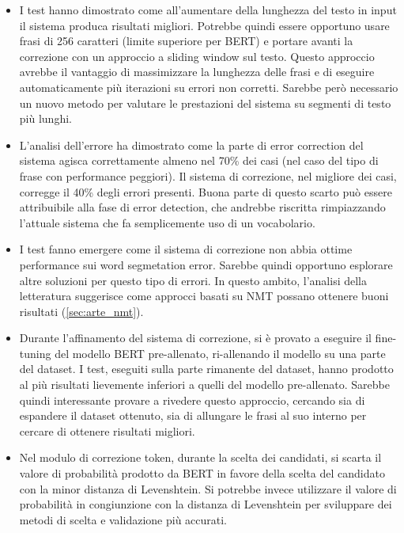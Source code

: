 \begin{itemize}
\item I test hanno dimostrato come all'aumentare della lunghezza del testo in input il sistema produca risultati migliori. Potrebbe quindi essere opportuno usare frasi di 256 caratteri (limite superiore per BERT) e portare avanti la correzione con un approccio a sliding window sul testo. Questo approccio avrebbe il vantaggio di massimizzare la lunghezza delle frasi e di eseguire automaticamente più iterazioni su errori non corretti. Sarebbe però necessario un nuovo metodo per valutare le prestazioni del sistema su segmenti di testo più lunghi.

\item L'analisi dell'errore ha dimostrato come la parte di error correction del sistema agisca correttamente almeno nel 70\% dei casi (nel caso del tipo di frase con performance peggiori). Il sistema di correzione, nel migliore dei casi, corregge il 40\% degli errori presenti. Buona parte di questo scarto può essere attribuibile alla fase di error detection, che andrebbe riscritta rimpiazzando l'attuale sistema che fa semplicemente uso di un vocabolario.

\item I test fanno emergere come il sistema di correzione non abbia ottime performance sui word segmetation error. Sarebbe quindi opportuno esplorare altre soluzioni per questo tipo di errori. In questo ambito, l'analisi della letteratura suggerisce come approcci basati su NMT possano ottenere buoni risultati (\autoref{sec:arte_nmt}).

\item Durante l'affinamento del sistema di correzione, si è provato a eseguire il fine-tuning del modello BERT pre-allenato, ri-allenando il modello su una parte del dataset. I test, eseguiti sulla parte rimanente del dataset, hanno prodotto al più risultati lievemente inferiori a quelli del modello pre-allenato. Sarebbe quindi interessante provare a rivedere questo approccio, cercando sia di espandere il dataset ottenuto, sia di allungare le frasi al suo interno per cercare di ottenere risultati migliori.

\item Nel modulo di correzione token, durante la scelta dei candidati, si scarta il valore di probabilità prodotto da BERT in favore della scelta del candidato con la minor distanza di Levenshtein. Si potrebbe invece utilizzare il valore di probabilità in congiunzione con la distanza di Levenshtein per sviluppare dei metodi di scelta e validazione più accurati.







\end{itemize}